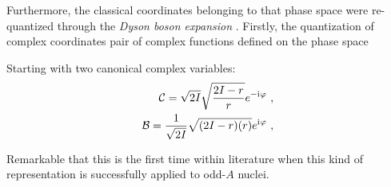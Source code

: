 Furthermore, the classical coordinates belonging to that phase space were re-quantized through the \emph{Dyson boson expansion} \cite{dyson1956general}. Firstly, the quantization of complex coordinates  pair of complex functions defined on the phase space  

Starting with two canonical complex variables:
\begin{align}
    \mathcal{C}=\sqrt{2I}\sqrt{\frac{2I-r}{r}}e^{-\iu\varphi}\ ,\nonumber\\
    \mathcal{B}=\frac{1}{\sqrt{2I}}\sqrt{(2I-r)(r)}e^{\iu\varphi}\ ,
\end{align}


Remarkable that this is the first time within literature when this kind of representation is successfully applied to odd-$A$ nuclei.